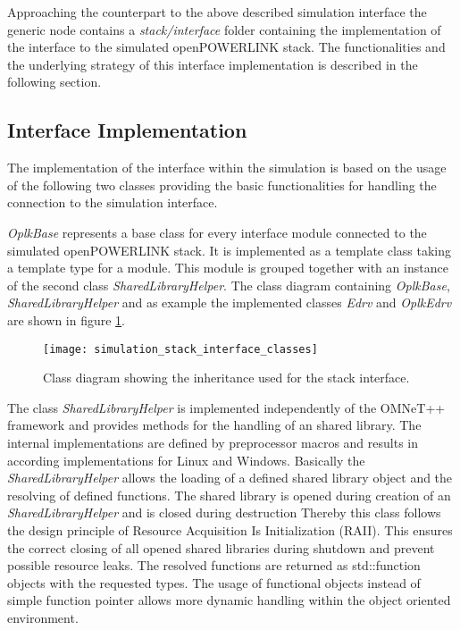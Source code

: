 Approaching the counterpart to the above described simulation interface the generic node contains a \emph{stack/interface} folder containing the implementation of the interface to the simulated openPOWERLINK stack.
The functionalities and the underlying strategy of this interface implementation is described in the following section.

\subsection{Interface Implementation}
\label{sec:porting_stack_interface}
The implementation of the interface within the simulation is based on the usage of the following two classes providing the basic functionalities for handling the connection to the simulation interface.

\emph{OplkBase} represents a base class for every interface module connected to the simulated openPOWERLINK stack.
It is implemented as a template class taking a template type for a module.
This module is grouped together with an instance of the second class \emph{SharedLibraryHelper}.
The class diagram containing \emph{OplkBase}, \emph{SharedLibraryHelper} and as example the implemented classes \emph{Edrv} and \emph{OplkEdrv} are shown in figure \ref{fig:simulation_stack_interface_classes}.

\begin{figure}
    \centering
    \texttt{[image: simulation\_stack\_interface\_classes]}
    \caption{Class diagram showing the inheritance used for the stack interface.}
    \label{fig:simulation_stack_interface_classes}
\end{figure}

The class \emph{SharedLibraryHelper} is implemented independently of the OMNeT++ framework and provides methods for the handling of an shared library.
The internal implementations are defined by preprocessor macros and results in according implementations for Linux and Windows.
Basically the \emph{SharedLibraryHelper} allows the loading of a defined shared library object and the resolving of defined functions.
The shared library is opened during creation of an \emph{SharedLibraryHelper} and is closed during destruction
Thereby this class follows the design principle of Resource Acquisition Is Initialization (RAII).
This ensures the correct closing of all opened shared libraries during shutdown and prevent possible resource leaks.
The resolved functions are returned as std::function objects with the requested types.
The usage of functional objects instead of simple function pointer allows more dynamic handling within the object oriented environment.

